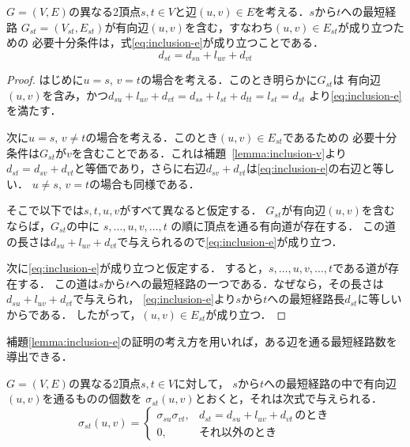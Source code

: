 \begin{lemma}
  \label{lemma:inclusion-e}
  $G=(V,E)$の異なる2頂点$s,t\in V$と辺$(u,v)\in E$を考える．$s$から$t$への最短経路
  $G_{st}=(V_{st},E_{st})$が有向辺$(u,v)$を含む，すなわち$(u,v)\in E_{st}$が成り立つための
  必要十分条件は，式\eqref{eq:inclusion-e}が成り立つことである．
  \begin{equation}
    d_{st}=d_{su}+l_{uv}+d_{vt}
    \label{eq:inclusion-e}
  \end{equation}
\end{lemma}
\begin{proof}
  はじめに$u=s$, $v=t$の場合を考える．このとき明らかに$G_{st}$は
  有向辺$(u,v)$を含み，かつ$d_{su}+l_{uv}+d_{vt}=d_{ss}+l_{st}+d_{tt}=l_{st}=d_{st}$
  より\eqref{eq:inclusion-e}を満たす．

  次に$u=s$, $v\neq t$の場合を考える．このとき$(u,v)\in E_{st}$であるための
  必要十分条件は$G_{st}$が$v$を含むことである．これは補題~\ref{lemma:inclusion-v}より
  $d_{st}=d_{sv}+d_{vt}$と等価であり，さらに右辺$d_{sv}+d_{vt}$は\eqref{eq:inclusion-e}の右辺と等しい．
  $u\neq s$, $v=t$の場合も同様である．

  そこで以下では$s,t,u,v$がすべて異なると仮定する．
  $G_{st}$が有向辺$(u,v)$を含むならば，$G_{st}$の中に
  $s,\ldots, u,v,\ldots,t$
  の順に頂点を通る有向道が存在する．
  この道の長さは$d_{su}+l_{uv}+d_{vt}$で与えられるので\eqref{eq:inclusion-e}が成り立つ．

  次に\eqref{eq:inclusion-e}が成り立つと仮定する．
  すると，$s,\ldots, u,v,\ldots,t$である道が存在する．
  この道は$s$から$t$への最短経路の一つである．なぜなら，その長さは$d_{su}+l_{uv}+d_{vt}$で与えられ，
  \eqref{eq:inclusion-e}より$s$から$t$への最短経路長$d_{st}$に等しいからである．
  したがって，$(u,v) \in E_{st}$が成り立つ．
\end{proof}

補題\ref{lemma:inclusion-e}の証明の考え方を用いれば，ある辺を通る最短経路数を導出できる．

\begin{lemma}
  $G=(V,E)$の異なる2頂点$s,t \in V$に対して，
  $s$から$t$への最短経路の中で有向辺$(u,v)$を通るものの個数を
  $\sigma_{st}(u,v)$とおくと，それは次式で与えられる．
  \begin{equation*}
    \sigma_{st}(u,v)=
    \begin{cases}
      \sigma_{su}\sigma_{vt}, & d_{st}=d_{su}+l_{uv}+d_{vt}\,\text{のとき} \\
      0, & \text{それ以外のとき}
    \end{cases}
  \end{equation*}
\end{lemma}

